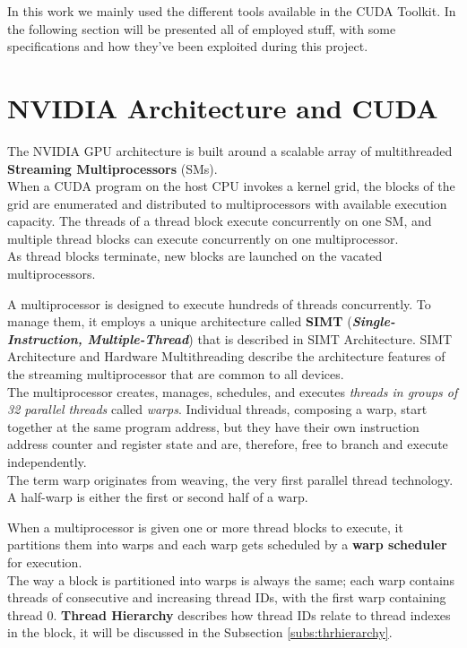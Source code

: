 In this work we mainly used the different tools available in the CUDA Toolkit. In the following section will be presented all of employed stuff, with some specifications and how they've been exploited during this project.

\section{NVIDIA Architecture and CUDA}
\label{sect:nvidiaarch}
	The NVIDIA GPU architecture is built around a scalable array of multithreaded \textbf{Streaming Multiprocessors} (SMs).\\
	When a CUDA program on the host CPU invokes a kernel grid, the blocks of the grid are enumerated and distributed to multiprocessors with available execution capacity. The threads of a thread block execute concurrently on one SM, and multiple thread blocks can execute concurrently on one multiprocessor.\\
	As thread blocks terminate, new blocks are launched on the vacated multiprocessors\cite{cudaguide}.
	
	A multiprocessor is designed to execute hundreds of threads concurrently. To manage them, it employs a unique architecture called \textbf{SIMT} (\textbf{\textit{Single-Instruction, Multiple-Thread}}) that is described in SIMT Architecture.
	SIMT Architecture and Hardware Multithreading describe the architecture features of the streaming multiprocessor that are common to all devices. \\
	
	The multiprocessor creates, manages, schedules, and executes \textit{threads in groups of 32 parallel threads} called \textit{warps}. Individual threads, composing a warp, start together at the same program address, but they have their own instruction address counter and register state and are, therefore, free to branch and execute independently.\\
	The term warp originates from weaving, the very first parallel thread technology. A half-warp is either the first or second half of a warp\cite{pattersonhennessy,cudaguide}.
	
	When a multiprocessor is given one or more thread blocks to execute, it partitions them into warps and each warp gets scheduled by a \textbf{warp scheduler} for execution.\\
	The way a block is partitioned into warps is always the same; each warp contains threads of consecutive and increasing thread IDs, with the first warp containing thread 0\cite{cudaguide}. \textbf{Thread Hierarchy} describes how thread IDs relate to thread indexes in the block, it will be discussed in the Subsection \ref{subs:thrhierarchy}.
	
